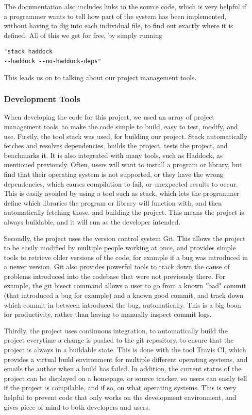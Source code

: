 The documentation also includes links to the source code, which is very helpful
if a programmer wants to tell how part of the system has been implemented,
without having to dig into each individual file, to find out exactly where
it is defined. All of this we get for free, by simply running
\begin{verbatim}
"stack haddock
--haddock --no-haddock-deps"
\end{verbatim}

This leads us on to talking about our project management tools.

\subsubsection{Development Tools}

When developing the code for this project, we used an array of project
management tools, to make the code simple to build, easy to test, modify,
and use. Firstly, the tool stack was used, for building our project.\parencite{code:stack2015}
Stack
automatically fetches and resolves dependencies, builds the project, tests
the project, and benchmarks it. It is also integrated with many tools, such
as Haddock, as mentioned previously. Often, users will want to install a
program or library, but find that their operating system is not supported,
or they have the wrong dependencies, which causes compilation to fail, or
unexpected results to occur. This is easily avoided by using a tool such as
stack, which lets the programmer define which libraries the program or library
will function with, and then automatically fetching those, and building the
project. This means the project is always buildable, and it will run as the
developer intended.

Secondly, the project uses the version control system Git.\parencite{code:torvalds2005}
This allows the project to be easily modified by multiple people working at
once, and provides simple tools to retrieve older versions of the code, for
example if a bug was introduced in a newer version. Git also provides powerful
tools to track down the cause of problems introduced into the codebase that
were not previously there. For example, the git bisect command allows a user
to go from a known "bad" commit (that introduced a bug for example) and a 
known good commit, and track down which commit in between introduced the bug,
automatically. This is a big boon for productivity, rather than having to manually
inspect commit logs.

Thirdly, the project uses continuous integration, to automatically build the
project everytime a change is pushed to the git repository, to ensure that
the project is always in a buildable state. This is done with the tool Travis
CI, \parencite{code:travis2011}
which provides a virtual build environment for multiple different operating
systems, and emails the author when a build has failed. In addition, the
current status of the project can be displayed on a homepage, or source tracker,
so users can easily tell if the project is compilable, and if so, on what
operating systems. This is very helpful to prevent code that only works on the
development environment, and gives piece of mind to both developers and users.

